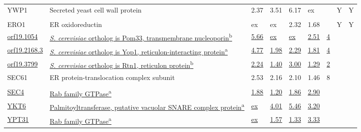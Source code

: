 \begin{ThreePartTable}
\begin{longtable}[t]{lllllllll}
\hspace{1em}YWP1 & Secreted yeast cell wall protein & 2.37 & 3.51 & 6.17 & ex &  & Y & Y\\
\addlinespace[0.3em]
\multicolumn{9}{l}{\textbf{Endoplasmic reticulum}}\\
\hspace{1em}ERO1 & ER oxidoreductin & ex & ex & 2.32 & 1.68 &  & Y & Y\\
\hspace{1em}\underline{orf19.1054} & \underline{\textit{S. cerevisiae} ortholog is Pom33, transmembrane nucleoporin\textsuperscript{b}} & \underline{5.66} & \underline{ex} & \underline{ex} & \underline{2.51} & \underline{4} & \underline{} & \underline{}\\
\hspace{1em}\underline{orf19.2168.3} & \underline{\textit{S. cerevisiae} ortholog is Yop1, reticulon-interacting protein\textsuperscript{a}} & \underline{4.77} & \underline{1.98} & \underline{2.29} & \underline{1.81} & \underline{4} & \underline{} & \underline{}\\
\hspace{1em}\underline{orf19.3799} & \underline{\textit{S. cerevisiae} ortholog is Rtn1, reticulon protein\textsuperscript{b}} & \underline{2.24} & \underline{1.40} & \underline{3.00} & \underline{1.29} & \underline{2} & \underline{} & \underline{}\\
\hspace{1em}SEC61 & ER protein-translocation complex subunit & 2.53 & 2.16 & 2.10 & 1.46 & 8 &  & \\
\addlinespace[0.3em]
\multicolumn{9}{l}{\textbf{Endosome, Golgi, transport vesicle}}\\
\hspace{1em}\underline{SEC4} & \underline{Rab family GTPase\textsuperscript{a}} & \underline{1.88} & \underline{1.20} & \underline{1.86} & \underline{2.90} & \underline{} & \underline{} & \underline{}\\
\hspace{1em}\underline{YKT6} & \underline{Palmitoyltransferase, putative vacuolar SNARE complex protein\textsuperscript{a}} & \underline{ex} & \underline{4.01} & \underline{5.46} & \underline{3.20} & \underline{} & \underline{} & \underline{}\\
\hspace{1em}\underline{YPT31} & \underline{Rab family GTPase\textsuperscript{a}} & \underline{ex} & \underline{1.57} & \underline{1.33} & \underline{3.33} & \underline{} & \underline{} & \underline{}\\

\end{longtable}
\end{ThreePartTable}
